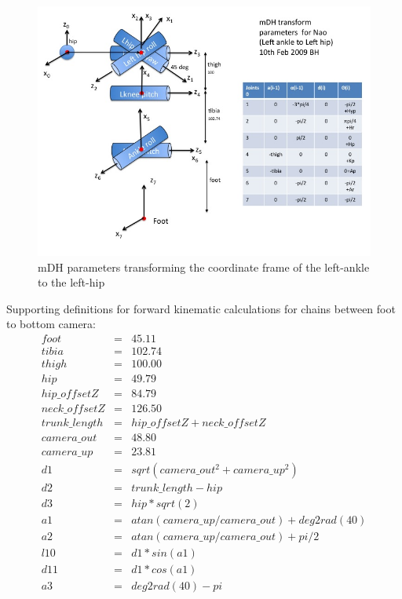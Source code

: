 \documentclass[pdftex,11pt,a4paper]{report}
\begin{document}
\begin{figure}
\centering
\includegraphics[width=1.0\textwidth]{figures/mDH-leftAnkleToHip.jpg}
\caption{mDH parameters transforming the coordinate frame of the left-ankle to the left-hip} \label{figmDH-leftAnkleToHip}
\end{figure}

Supporting definitions for forward kinematic calculations for chains between foot to bottom camera:
\begin{eqnarray}
foot         &=&  45.11\\
tibia        &=& 102.74\\
thigh        &=& 100.00\\
hip          &=&  49.79\\
hip{\_}offsetZ  &=&  84.79\\
neck{\_}offsetZ &=& 126.50\\
trunk{\_}length &=& hip{\_}offsetZ + neck{\_}offsetZ\\
camera{\_}out   &=&  48.80\\
camera{\_}up    &=&  23.81\\
d1 &=& sqrt(camera{\_}out^2+camera{\_}up^2)\\
d2 &=& trunk{\_}length - hip\\
d3 &=& hip*sqrt(2)\\
a1 &=& atan(camera{\_}up/camera{\_}out)+deg2rad(40)\\
a2 &=& atan(camera{\_}up/camera{\_}out)+pi/2\\
l10 &=& d1*sin(a1)\\
d11 &=& d1*cos(a1)\\
a3 &=& deg2rad(40)-pi\\
\end{eqnarray}
\end{document}
